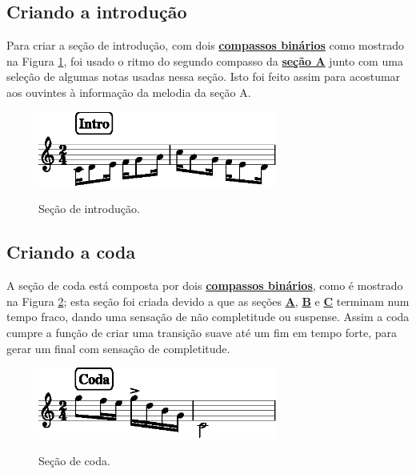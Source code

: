 \subsection{Criando a introdução}
Para criar a seção de introdução, 
com dois \hyperref[subsec:compassobinario]{\textbf{compassos binários}} como mostrado na Figura \ref{fig:section-intro},
foi usado o ritmo do segundo compasso da \hyperref[subsec:criandoa]{\textbf{seção A}} 
junto com uma seleção de algumas notas usadas nessa seção. 
Isto foi feito assim para acostumar aos ouvintes à informação da melodia da seção A.
     \begin{figure}[H]
	     \centering
	     \href{https://drive.google.com/file/d/11yCuZzXDe-fD9OxCfYYR1-B3IfPG70cV/view?usp=sharing}{\includegraphics[width=0.7\textwidth]{chapters/cap-musica-topicos/section-intro-1.eps}}
	     \caption{Seção de introdução.}
	     \label{fig:section-intro}
     \end{figure}

\subsection{Criando a coda}
A seção de coda está composta por dois \hyperref[subsec:compassobinario]{\textbf{compassos binários}}, 
como é mostrado na Figura \ref{fig:section-coda};
esta seção foi criada devido a que as seções 
\hyperref[subsec:criandoa]{\textbf{A}},
\hyperref[subsec:criandob]{\textbf{B}} e
\hyperref[subsec:criandoc]{\textbf{C}}
terminam num tempo fraco, dando uma sensação de não completitude ou suspense.
Assim a coda cumpre a função de criar uma transição suave até um fim em tempo forte,
para gerar um final com sensação de completitude.
     \begin{figure}[H]
	     \centering
	     \href{https://drive.google.com/file/d/13WULHlz-Dfc6xnU0shYjoCc7OtJUWUVs/view?usp=sharing}{\includegraphics[width=0.7\textwidth]{chapters/cap-musica-topicos/section-coda-1.eps}}
	     \caption{Seção de coda.}
	     \label{fig:section-coda}
     \end{figure}

